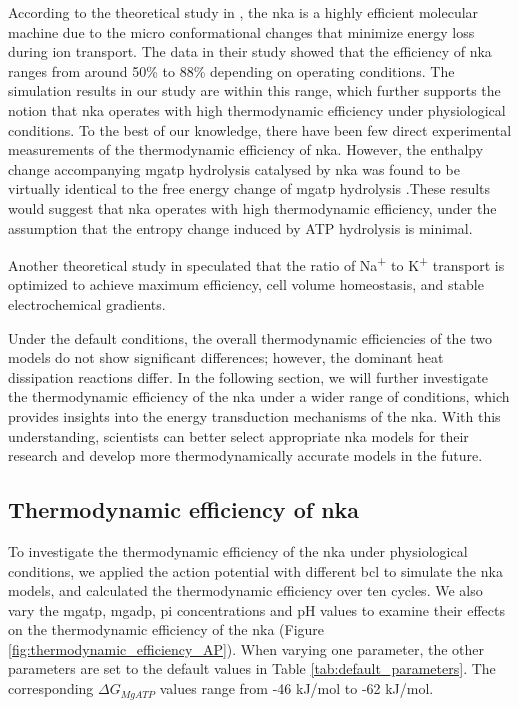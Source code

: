\documentclass{biophys-new}
\newcommand{\rev}[1]{{\color{black} #1}}
\begin{document}
According to the theoretical study in \cite{wagoner_mechanisms_2019}, the \gls{nka} is a highly efficient molecular machine due to the micro conformational changes that minimize energy loss during ion transport. The data in their study showed that the efficiency of \gls{nka} ranges from around 50\% to 88\% depending on operating conditions. The simulation results in our study are within this range, which further supports the notion that \gls{nka} operates with high thermodynamic efficiency under physiological conditions. \rev{To the best of our knowledge, there have been few direct experimental measurements of the thermodynamic efficiency of \gls{nka}. However, the enthalpy change accompanying \gls{mgatp} hydrolysis catalysed by \gls{nka} was found to be virtually identical to the free energy change of \gls{mgatp} hydrolysis \cite{noske_investigation_2010}.These results would suggest that \gls{nka} operates with high thermodynamic efficiency, under the assumption that the entropy change induced by ATP hydrolysis is minimal.}

Another theoretical study in \cite{peluffo_nak-atpase_2023} speculated that the ratio of Na\textsuperscript{+} to K\textsuperscript{+} transport is optimized to achieve maximum efficiency, cell volume homeostasis, and stable electrochemical gradients. 

\rev{Under the default conditions, the overall thermodynamic efficiencies of the two models do not show significant differences; however, the dominant heat dissipation reactions differ.} In the following section, we will further investigate the thermodynamic efficiency of the \gls{nka} under a \rev{wider} range of conditions, which provides insights into the energy transduction mechanisms of the \gls{nka}. With this understanding, scientists can better select appropriate \gls{nka} models for their research and develop more \rev{thermodynamically} accurate models in the future.

\subsection*{Thermodynamic efficiency of \Gls{nka} }


To investigate the thermodynamic efficiency of the \gls{nka} under physiological conditions, we applied the action potential with different \gls{bcl} to simulate the \gls{nka} models, and calculated the thermodynamic efficiency over ten cycles.
We also vary the \gls{mgatp}, \gls{mgadp}, \gls{pi} concentrations and pH values to examine their effects on the thermodynamic efficiency of the \gls{nka} (Figure \ref{fig:thermodynamic_efficiency_AP}).
When varying one parameter, the other parameters are set to the default values in Table \ref{tab:default_parameters}.
The corresponding $\Delta G_{MgATP}$ values range from -46 kJ/mol to -62 kJ/mol.
\end{document}
